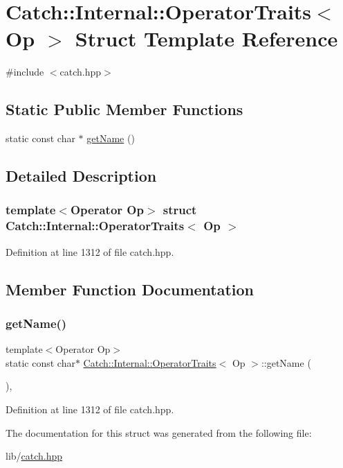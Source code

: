 \hypertarget{struct_catch_1_1_internal_1_1_operator_traits}{}\section{Catch\+:\+:Internal\+:\+:Operator\+Traits$<$ Op $>$ Struct Template Reference}
\label{struct_catch_1_1_internal_1_1_operator_traits}


{\ttfamily \#include $<$catch.\+hpp$>$}

\subsection*{Static Public Member Functions}
\begin{DoxyCompactItemize}
\item 
static const char $\ast$ \hyperlink{struct_catch_1_1_internal_1_1_operator_traits_ac6d08082ea33348d42bc4ccbd6d07671}{get\+Name} ()
\end{DoxyCompactItemize}


\subsection{Detailed Description}
\subsubsection*{template$<$Operator Op$>$\newline
struct Catch\+::\+Internal\+::\+Operator\+Traits$<$ Op $>$}



Definition at line 1312 of file catch.\+hpp.



\subsection{Member Function Documentation}
\hypertarget{struct_catch_1_1_internal_1_1_operator_traits_ac6d08082ea33348d42bc4ccbd6d07671}{}\label{struct_catch_1_1_internal_1_1_operator_traits_ac6d08082ea33348d42bc4ccbd6d07671} 
\subsubsection{\texorpdfstring{get\+Name()}{getName()}}
{\footnotesize\ttfamily template$<$Operator Op$>$ \\
static const char$\ast$ \hyperlink{struct_catch_1_1_internal_1_1_operator_traits}{Catch\+::\+Internal\+::\+Operator\+Traits}$<$ Op $>$\+::get\+Name (\begin{DoxyParamCaption}{ }\end{DoxyParamCaption})\hspace{0.3cm}{\ttfamily [inline]}, {\ttfamily [static]}}



Definition at line 1312 of file catch.\+hpp.



The documentation for this struct was generated from the following file\+:\begin{DoxyCompactItemize}
\item 
lib/\hyperlink{catch_8hpp}{catch.\+hpp}\end{DoxyCompactItemize}

